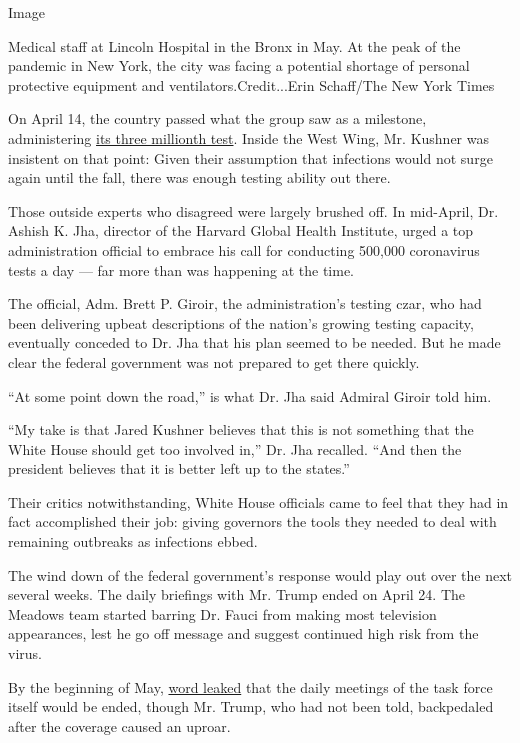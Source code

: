 Image

Medical staff at Lincoln Hospital in the Bronx in May. At the peak of
the pandemic in New York, the city was facing a potential shortage of
personal protective equipment and ventilators.Credit...Erin Schaff/The
New York Times

On April 14, the country passed what the group saw as a milestone,
administering \href{https://covidtracking.com/data/us-daily}{its three
millionth test}. Inside the West Wing, Mr. Kushner was insistent on that
point: Given their assumption that infections would not surge again
until the fall, there was enough testing ability out there.

Those outside experts who disagreed were largely brushed off. In
mid-April, Dr. Ashish K. Jha, director of the Harvard Global Health
Institute, urged a top administration official to embrace his call for
conducting 500,000 coronavirus tests a day --- far more than was
happening at the time.

The official, Adm. Brett P. Giroir, the administration's testing czar,
who had been delivering upbeat descriptions of the nation's growing
testing capacity, eventually conceded to Dr. Jha that his plan seemed to
be needed. But he made clear the federal government was not prepared to
get there quickly.

``At some point down the road,'' is what Dr. Jha said Admiral Giroir
told him.

``My take is that Jared Kushner believes that this is not something that
the White House should get too involved in,'' Dr. Jha recalled. ``And
then the president believes that it is better left up to the states.''

Their critics notwithstanding, White House officials came to feel that
they had in fact accomplished their job: giving governors the tools they
needed to deal with remaining outbreaks as infections ebbed.

The wind down of the federal government's response would play out over
the next several weeks. The daily briefings with Mr. Trump ended on
April 24. The Meadows team started barring Dr. Fauci from making most
television appearances, lest he go off message and suggest continued
high risk from the virus.

By the beginning of May,
\href{https://www.nytimes.com/2020/05/05/us/politics/coronavirus-task-force-trump.html}{word
leaked} that the daily meetings of the task force itself would be ended,
though Mr. Trump, who had not been told, backpedaled after the coverage
caused an uproar.

